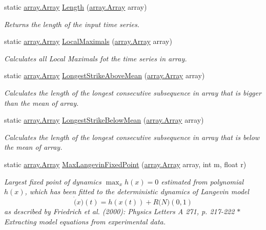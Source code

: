 \begin{DoxyCompactItemize}
static \mbox{\hyperlink{classkhiva_1_1array_1_1_array}{array.\+Array}} \mbox{\hyperlink{classkhiva_1_1features_1_1_features_a20c2e7a25ea7cb185d4093affc417edf}{Length}} (\mbox{\hyperlink{classkhiva_1_1array_1_1_array}{array.\+Array}} array)
\begin{DoxyCompactList}\small\item\em Returns the length of the input time series. \end{DoxyCompactList}\item 
static \mbox{\hyperlink{classkhiva_1_1array_1_1_array}{array.\+Array}} \mbox{\hyperlink{classkhiva_1_1features_1_1_features_aecd48dfe93b9ba4790a53ce80da6b80d}{Local\+Maximals}} (\mbox{\hyperlink{classkhiva_1_1array_1_1_array}{array.\+Array}} array)
\begin{DoxyCompactList}\small\item\em Calculates all Local Maximals fot the time series in array. \end{DoxyCompactList}\item 
static \mbox{\hyperlink{classkhiva_1_1array_1_1_array}{array.\+Array}} \mbox{\hyperlink{classkhiva_1_1features_1_1_features_ad57efb15959db76c4e9f7de34b78a7bc}{Longest\+Strike\+Above\+Mean}} (\mbox{\hyperlink{classkhiva_1_1array_1_1_array}{array.\+Array}} array)
\begin{DoxyCompactList}\small\item\em Calculates the length of the longest consecutive subsequence in array that is bigger than the mean of array. \end{DoxyCompactList}\item 
static \mbox{\hyperlink{classkhiva_1_1array_1_1_array}{array.\+Array}} \mbox{\hyperlink{classkhiva_1_1features_1_1_features_a271a7e30ff4941af9df98d042c4d7cd4}{Longest\+Strike\+Below\+Mean}} (\mbox{\hyperlink{classkhiva_1_1array_1_1_array}{array.\+Array}} array)
\begin{DoxyCompactList}\small\item\em Calculates the length of the longest consecutive subsequence in array that is below the mean of array. \end{DoxyCompactList}\item 
static \mbox{\hyperlink{classkhiva_1_1array_1_1_array}{array.\+Array}} \mbox{\hyperlink{classkhiva_1_1features_1_1_features_a173e9d29094ff881cbdae80cc61a2471}{Max\+Langevin\+Fixed\+Point}} (\mbox{\hyperlink{classkhiva_1_1array_1_1_array}{array.\+Array}} array, int m, float r)
\begin{DoxyCompactList}\small\item\em Largest fixed point of dynamics $\max_x {h(x)=0}$ estimated from polynomial $h(x)$, which has been fitted to the deterministic dynamics of Langevin model \[ \dot(x)(t) = h(x(t)) + R \mathcal(N)(0, 1) \] as described by Friedrich et al. (2000)\+: Physics Letters A 271, p. 217-\/222 $\ast$\+Extracting model equations from experimental data. \end{DoxyCompactList}\item 

\end{DoxyCompactItemize}
